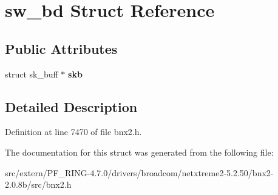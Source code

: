 \hypertarget{structsw__bd}{
\section{sw\_\-bd Struct Reference}
\label{structsw__bd}
}
\subsection*{Public Attributes}
\begin{DoxyCompactItemize}
\item 
\hypertarget{structsw__bd_ac048af125ccea2ab08e30473fa42f327}{
struct sk\_\-buff $\ast$ {\bfseries skb}}
\label{structsw__bd_ac048af125ccea2ab08e30473fa42f327}

\end{DoxyCompactItemize}


\subsection{Detailed Description}


Definition at line 7470 of file bnx2.h.



The documentation for this struct was generated from the following file:\begin{DoxyCompactItemize}
\item 
src/extern/PF\_\-RING-\/4.7.0/drivers/broadcom/netxtreme2-\/5.2.50/bnx2-\/2.0.8b/src/bnx2.h\end{DoxyCompactItemize}
